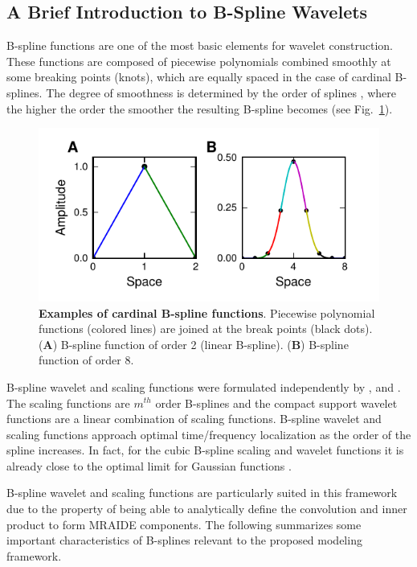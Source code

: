 \documentclass[review,authoryear,3p]{elsarticle}
\begin{document}
\subsection{A Brief Introduction to B-Spline Wavelets}
B-spline functions are one of the most basic elements for wavelet construction. These functions are composed of piecewise polynomials combined smoothly at some breaking points (knots), which are equally spaced in the case of cardinal B-splines. The degree of smoothness is determined by the order of splines \citep{Goswami1999}, where the higher the order the smoother the resulting B-spline becomes (see Fig.~\ref{fig:Figure0}).
\begin{figure}[!t]
\centering
\includegraphics{./Graph/fig3.pdf}
\caption{{\bf Examples of cardinal B-spline functions}. Piecewise polynomial functions (colored lines) are joined at the break points (black dots). (\textbf{A}) B-spline function of order 2 (linear B-spline). (\textbf{B}) B-spline function of order 8.}
\label{fig:Figure0}
\end{figure}
 
B-spline wavelet and scaling functions were formulated independently by \citet{Chui1992b}, \citet{Chui1992} and \citet{Unser1993}.  The scaling functions are $m^{th}$ order B-splines and the compact support wavelet functions are a linear combination of scaling functions. B-spline wavelet and scaling functions approach optimal time/frequency localization as the order of the spline increases. In fact, for the cubic B-spline scaling and wavelet functions it is already close to the optimal limit for Gaussian functions \citep{Unser1999}. 

B-spline wavelet and scaling functions are particularly suited in this framework due to the property of being able to analytically define the convolution and inner product to form MRAIDE components. The following summarizes some important characteristics of B-splines relevant to the proposed modeling framework. 
\end{document}
